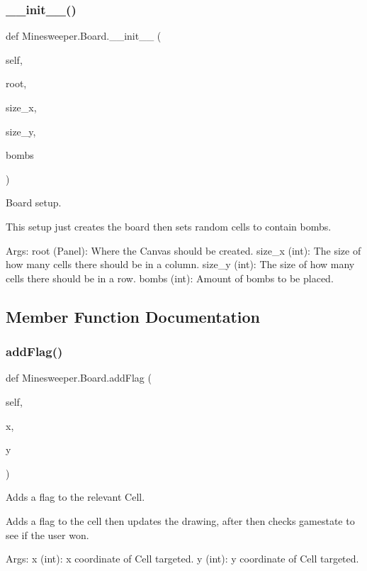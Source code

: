 \subsubsection{\texorpdfstring{\+\_\+\+\_\+init\+\_\+\+\_\+()}{\_\_init\_\_()}}
{\footnotesize\ttfamily def Minesweeper.\+Board.\+\_\+\+\_\+init\+\_\+\+\_\+ (\begin{DoxyParamCaption}\item[{}]{self,  }\item[{}]{root,  }\item[{}]{size\+\_\+x,  }\item[{}]{size\+\_\+y,  }\item[{}]{bombs }\end{DoxyParamCaption})}

\begin{DoxyVerb}Board setup.

This setup just creates the board then sets random cells to contain bombs.

Args:
    root (Panel): Where the Canvas should be created.
    size_x (int): The size of how many cells there should be in a column.
    size_y (int): The size of how many cells there should be in a row.
    bombs (int): Amount of bombs to be placed.\end{DoxyVerb}
 

\subsection{Member Function Documentation}
\mbox{\label{class_minesweeper_1_1_board_a5a647633eb873455d51ee3fabde9a07a}} 
\subsubsection{\texorpdfstring{add\+Flag()}{addFlag()}}
{\footnotesize\ttfamily def Minesweeper.\+Board.\+add\+Flag (\begin{DoxyParamCaption}\item[{}]{self,  }\item[{}]{x,  }\item[{}]{y }\end{DoxyParamCaption})}

\begin{DoxyVerb}Adds a flag to the relevant Cell.

Adds a flag to the cell then updates the drawing, after then checks
gamestate to see if the user won.

Args:
    x (int): x coordinate of Cell targeted.
    y (int): y coordinate of Cell targeted.
\end{DoxyVerb}
 \mbox{\label{class_minesweeper_1_1_board_ac5b393b15aedf45687cc5ed242fd3304}} 
